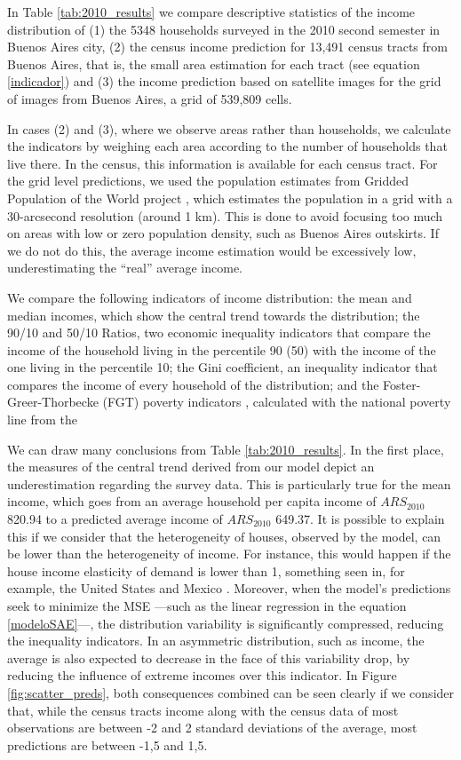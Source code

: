 \documentclass[conference]{IEEEtran}
\begin{document}
In Table \ref{tab:2010_results} we compare descriptive statistics of the income distribution of (1) the 5348 households surveyed in the 2010 second semester in Buenos Aires city, (2) the census income prediction for 13,491 census tracts from Buenos Aires, that is, the small area estimation for each tract (see equation \ref{indicador}) and (3) the income prediction based on satellite images for the grid of images from Buenos Aires, a grid of 539,809 cells.

In cases (2) and (3), where we observe areas rather than households, we calculate the indicators by weighing each area according to the number of households that live there. In the census, this information is available for each census tract. For the grid level predictions, we used the population estimates from Gridded Population of the World project \citep{Gridpop}, which estimates the population in a grid with a 30-arcsecond resolution (around 1 km). This is done to avoid focusing too much on areas with low or zero population density, such as Buenos Aires outskirts. If we do not do this, the average income estimation would be excessively low, underestimating the “real” average income.

We compare the following indicators of income distribution: the mean and median incomes, which show the central trend towards the distribution; the 90/10 and 50/10 Ratios, two economic inequality indicators that compare the income of the household living in the percentile 90 (50) with the income of the one living in the percentile 10; the Gini coefficient, an inequality indicator that compares the income of every household of the distribution; and the Foster-Greer-Thorbecke (FGT) poverty indicators \citep{foster1984}, calculated with the national poverty line from the \citet{SEDLAC} %

We can draw many conclusions from Table \ref{tab:2010_results}. In the first place, the measures of the central trend derived from our model depict an underestimation regarding the survey data. This is particularly true for the mean income, which goes from an average household per capita income of $ARS_{2010}$ 820.94 to a predicted average income of $ARS_{2010}$ 649.37. It is possible to explain this if we consider that the heterogeneity of houses, observed by the model, can be lower than the heterogeneity of income. For instance, this would happen if the house income elasticity of demand is lower than 1, something seen in, for example, the United States \citep{hansen1998} and Mexico \citep{adamuz2016demanda}. Moreover, when the model's predictions seek to minimize the MSE ---such as the linear regression in the equation \ref{modeloSAE}---, the distribution variability is significantly compressed, reducing the inequality indicators. In an asymmetric distribution, such as income, the average is also expected to decrease in the face of this variability drop, by reducing the influence of extreme incomes over this indicator. In Figure \ref{fig:scatter_preds}, both consequences combined can be seen clearly if we consider that, while the census tracts income along with the census data of most observations are between -2 and 2 standard deviations of the average, most predictions are between -1,5 and 1,5.
\end{document}
